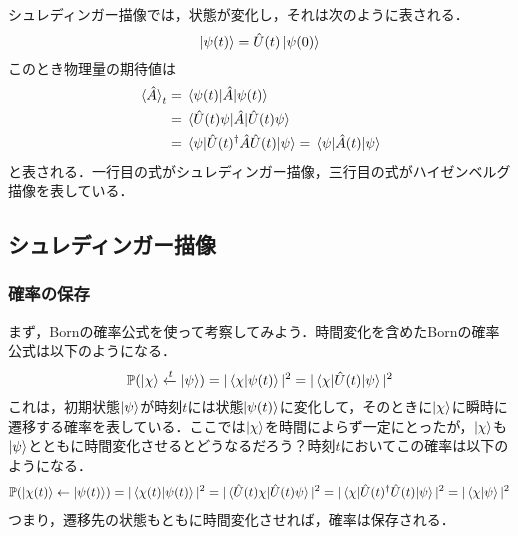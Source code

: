 \documentclass[a4paper,10pt,uplatex]{jsarticle}
\begin{document}
シュレディンガー描像では，状態が変化し，それは次のように表される．
\begin{equation}
    \ket{\psi(t)} = \hat{U}(t)\ket{\psi(0)}
\end{equation}
このとき物理量の期待値は
\begin{align}
    \ev*{\A}_t &= \ev{\A}{\psi(t)} \\
    &= \ev*{\A}{\U(t)\psi} \\
    &= \ev{\U(t)^\dagger\A\U(t)}{\psi} = \ev{\A(t)}{\psi}
\end{align}
と表される．一行目の式がシュレディンガー描像，三行目の式がハイゼンベルグ描像を表している．

\subsection{シュレディンガー描像}
\subsubsection{確率の保存}
まず，Bornの確率公式を使って考察してみよう．時間変化を含めたBornの確率公式は以下のようになる．
\begin{equation}
    \mathbb{P}(\ket{\chi} \xleftarrow{t} \ket{\psi}) = |\braket{\chi}{\psi(t)}|^2 = |\mel{\chi}{\hat{U}(t)}{\psi}|^2
\end{equation}
これは，初期状態$\ket{\psi}$が時刻$t$には状態$\ket{\psi(t)}$に変化して，そのときに$\ket{\chi}$に瞬時に遷移する確率を表している．ここでは$\ket{\chi}$を時間によらず一定にとったが，$\ket{\chi}$も$\ket{\psi}$とともに時間変化させるとどうなるだろう？時刻$t$においてこの確率は以下のようになる．
\begin{align}
    \mathbb{P}(\ket{\chi(t)} \leftarrow \ket{\psi(t)}) = |\braket{\chi(t)}{\psi(t)}|^2 = |\braket*{\hat{U}(t)\chi}{\hat{U}(t)\psi}|^2 = |\mel{\chi}{\hat{U}(t)^\dagger \hat{U}(t)}{\psi}|^2 = |\braket{\chi}{\psi}|^2
\end{align}
つまり，遷移先の状態もともに時間変化させれば，確率は保存される．
\end{document}
